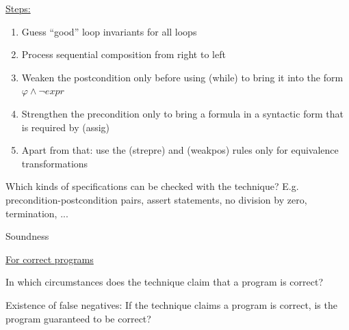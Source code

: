 \documentclass[a4paper]{article}
\begin{document}
\begin{minipage}[t]{0.16\linewidth}
\begin{betterlist}
{{\begin{betterlist}
\begin{betterlist}
					\end{betterlist}
					\item \underline{Steps:}
					\begin{enumerate}
						\item  Guess \enquote{good} loop invariants for all loops
						\item  Process sequential composition from right to left
						\item Weaken the postcondition only before using (while) to bring it into the form $\varphi \land \neg expr$
						\item Strengthen the precondition only to bring a formula in a syntactic form that is required by (assig)
						\item Apart from that: use the (strepre) and (weakpos) rules only for equivalence transformations
					\end{enumerate}
				\end{betterlist}
			}}
		\item Which kinds of specifications can be checked with the technique? E.g. precondition-postcondition pairs, assert statements, no division by zero, termination, ...

		\item \alert{Soundness}
		\begin{betterlist}
			\item \underline{For correct programs}
			\begin{betterlist}
				\item In which circumstances does the technique claim that a program is correct?

				\item Existence of false negatives: If the technique claims a program is correct, is the program guaranteed to be correct?


\end{betterlist}
\end{betterlist}
\end{betterlist}
\end{minipage}
\end{document}
